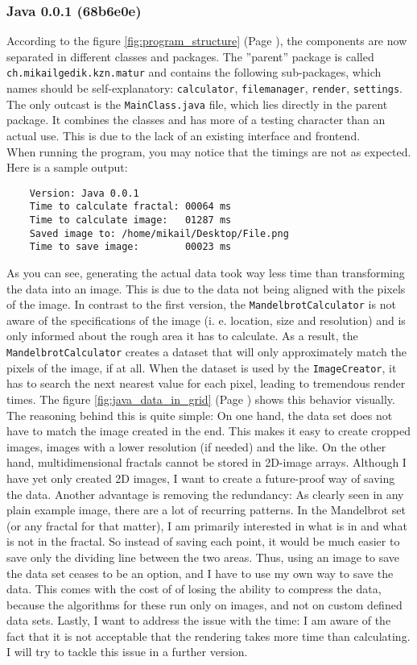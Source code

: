 \documentclass[10pt,a4paper,titlepage]{article}
\begin{document}
	\subsubsection{Java 0.0.1 (68b6e0e)}
	According to the figure \ref{fig:program_structure} (Page \pageref{fig:program_structure}), the components are now separated in different classes and packages. The ''parent'' package is called \verb|ch.mikailgedik.kzn.matur| and contains the following sub-packages, which names should be self-explanatory: \verb|calculator|, \verb|filemanager|, \verb|render|, \verb|settings|. The only outcast is the \verb|MainClass.java| file, which lies directly in the parent package. It combines the classes and has more of a testing character than an actual use. This is due to the lack of an existing interface and frontend.\\
	When running the program, you may notice that the timings are not as expected. Here is a sample output:
	\begin{verbatim}
	Version: Java 0.0.1
	Time to calculate fractal: 00064 ms
	Time to calculate image:   01287 ms
	Saved image to: /home/mikail/Desktop/File.png
	Time to save image:        00023 ms
	\end{verbatim}
	As you can see, generating the actual data took way less time than transforming the data into an image. This is due to the data not being aligned with the pixels of the image. In contrast to the first version, the \verb|MandelbrotCalculator| is not aware of the specifications of the image (i. e. location, size and resolution) and is only informed about the rough area it has to calculate. As a result, the \verb|MandelbrotCalculator| creates a dataset that will only approximately match the pixels of the image, if at all. When the dataset is used by the \verb|ImageCreator|, it has to search the next nearest value for each pixel, leading to tremendous render times. The figure \ref{fig:java_data_in_grid} (Page \pageref{fig:java_data_in_grid}) shows this behavior visually.\\
	The reasoning behind this is quite simple: On one hand, the data set does not have to match the image created in the end. This makes it easy to create cropped images, images with a lower resolution (if needed) and the like. On the other hand, multidimensional fractals cannot be stored in 2D-image arrays. Although I have yet only created 2D images, I want to create a future-proof way of saving the data. Another advantage is removing the redundancy: As clearly seen in any plain example image, there are a lot of recurring patterns. In the Mandelbrot set (or any fractal for that matter), I am primarily interested in what is in and what is not in the fractal. So instead of saving each point, it would be much easier to save only the dividing line between the two areas. Thus, using an image to save the data set ceases to be an option, and I have to use my own way to save the data. This comes with the cost of of losing the ability to compress the data, because the algorithms for these run only on images, and not on custom defined data sets. Lastly, I want to address the issue with the time: I am aware of the fact that it is not acceptable that the rendering takes more time than calculating. I will try to tackle this issue in a further version.
\end{document}
